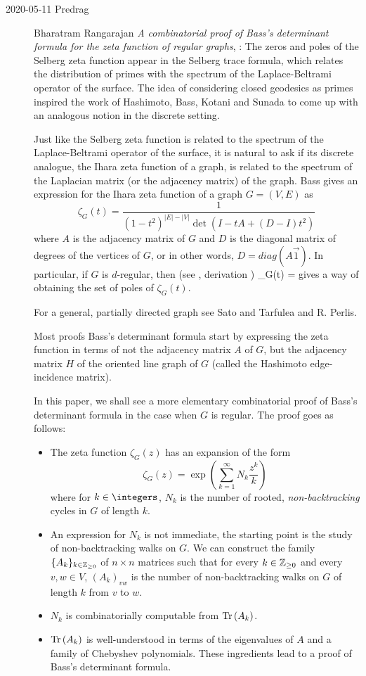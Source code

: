 \begin{description}
\item[2020-05-11 Predrag]
Bharatram Rangarajan
{\em A combinatorial proof of Bass's determinant formula for the zeta
function of regular graphs}, :
The zeros and poles of the Selberg zeta
function appear in the Selberg trace formula, which relates the
distribution of primes with the spectrum of the Laplace-Beltrami operator
of the surface. The idea of considering closed geodesics as primes
inspired the work of Hashimoto, Bass, Kotani
and Sunada to come up with an analogous notion in the
discrete setting.

Just like the Selberg zeta function is related to the spectrum of the
Laplace-Beltrami operator of the surface, it is natural to ask if its
discrete analogue, the Ihara zeta function of a graph, is related to the
spectrum of the Laplacian matrix (or the adjacency matrix) of the graph.
Bass gives an expression for the Ihara zeta function of a
graph $G=(V,E)$ as
$$
\zeta_G(t) = \frac{1}{(1-t^2)^{|E|-|V|} \det(I-tA+(D-I)t^2)}
$$
where $A$ is the adjacency matrix of $G$ and $D$ is the diagonal matrix
of degrees of the vertices of $G$, or in other words, $D=diag(A\vec{1})$.
In particular, if $G$ is $d$-regular, then (see ,
derivation )
\beq
\zeta_G(t) = 
gives a way of obtaining the set of poles
of $\zeta_G(t)$.

For a general, partially directed graph see Sato and
Tarfulea and R. Perlis.

Most proofs Bass's determinant formula start by expressing the zeta
function in terms of not the adjacency matrix $A$ of $G$, but the
adjacency matrix $H$ of the oriented line graph of $G$ (called the
Hashimoto edge-incidence matrix).

In this paper, we shall see a more elementary combinatorial proof of
Bass's determinant formula in the case when $G$ is regular.
The proof goes as
follows:
\begin{itemize}
\item
    The zeta function $\zeta_G({z})$ has an expansion of the form
$$
\zeta_G({z})= \exp\left( \sum \limits_{k=1}^{\infty} N_k \frac{{z}^k}{k} \right)
$$
where for $k \in \integers$, $N_k$ is the number of rooted,
\emph{non-backtracking} cycles in $G$ of length $k$.
\item
    An expression for $N_k$ is not immediate, the starting
    point is the study of non-backtracking walks on $G$. We can construct
    the family $\{A_k\}_{k \in \mathbb{Z}_{\small{\geq 0}}}$ of $n \times
    n$ matrices such that for every $k \in \mathbb{Z}_{\small{\geq0}}$
    and every $v,w \in V$, $(A_k)_{vw}$ is the number of
    non-backtracking walks on $G$ of length $k$ from $v$ to $w$.
\item
    $N_k$ is combinatorially computable from $\mbox{\rm Tr}\,(A_k)$.
\item
    $\mbox{\rm Tr}\,(A_k)$ is well-understood in terms of the eigenvalues of $A$ and
    a family of Chebyshev polynomials. These ingredients lead to a proof
    of Bass's determinant formula.
\end{itemize}



\end{description}
